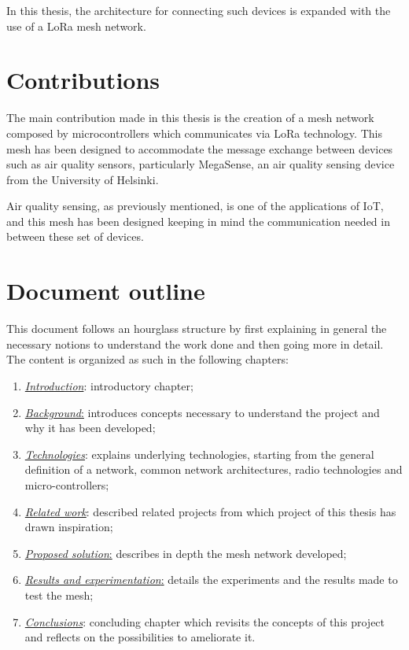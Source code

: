 	In this thesis, the architecture for connecting such devices is expanded with the use of a LoRa mesh network.
	
	\section{Contributions}\label{sec:contributions}
	
		The main contribution made in this thesis is the creation of a mesh network composed by microcontrollers which communicates via LoRa technology.
		This mesh has been designed to accommodate the message exchange between devices such as air quality sensors, particularly MegaSense, an air quality sensing device from the University of Helsinki.
		
		Air quality sensing, as previously mentioned, is one of the applications of IoT, and this mesh has been designed keeping in mind the communication needed in between these set of devices.
		
	\section{Document outline}\label{sec:document_outline}
		
		This document follows an hourglass structure by first explaining in general the necessary notions to understand the work done and then going more in detail.
		The content is organized as such in the following chapters:
		\begin{enumerate}
			\item \hyperref[chapter:introduction]{\textit{Introduction}}: introductory chapter;
			\item \hyperref[chapter:background]{\textit{Background}:} introduces concepts necessary to understand the project and why it has been developed;
			\item \hyperref[chapter:technologies]{\textit{Technologies}}: explains underlying technologies, starting
			from the general definition of a network, common network architectures, radio technologies and micro-controllers;
			\item \hyperref[chapter:related_work]{\textit{Related work}}: described related projects from which project of this thesis has drawn inspiration;
			\item \hyperref[chapter:proposed_solution]{\textit{Proposed solution}:} describes in depth the mesh network developed;
			\item \hyperref[chapter:results]{\textit{Results and experimentation}:} details the experiments and the results made to test the mesh;
			\item \hyperref[chapter:conclusions]{\textit{Conclusions}}: concluding chapter which revisits the concepts of this project and reflects on the possibilities to ameliorate it.
			
		\end{enumerate}